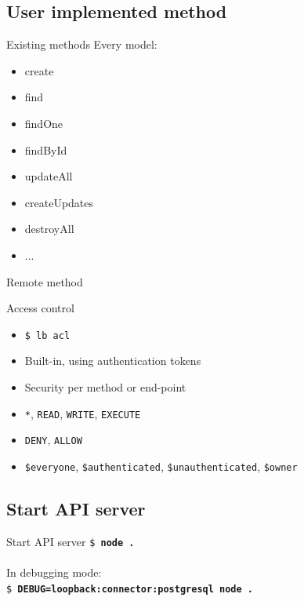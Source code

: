\documentclass[11pt]{beamer}
\begin{document}
\subsection{User implemented method}
\begin{frame}{Existing methods}
Every model:
\begin{itemize}
\item create
\item find
\item findOne
\item findById
\item updateAll
\item createUpdates
\item destroyAll
\item ...
\end{itemize}
\end{frame}
\begin{frame}{Remote method}

\end{frame}

\begin{frame}{Access control}
\begin{itemize}
\item \texttt{\$ lb acl}
\item Built-in, using authentication tokens
\item Security per method or end-point
\item \texttt{*}, \texttt{READ}, \texttt{WRITE}, \texttt{EXECUTE}
\item \texttt{DENY}, \texttt{ALLOW}
\item \texttt{\$everyone}, \texttt{\$authenticated}, \texttt{\$unauthenticated}, \texttt{\$owner}
\end{itemize}
\end{frame}

\subsection{Start API server}
\begin{frame}{Start API server}
\texttt{\$ \textbf{node .}}\\
~\\
In debugging mode:\\
\texttt{\$ \textbf{DEBUG=loopback:connector:postgresql node .}}
\end{frame}
\end{document}
